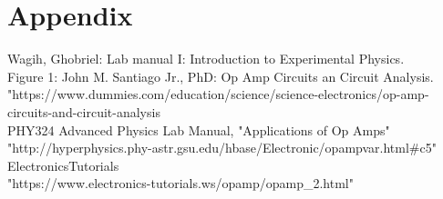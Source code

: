 \documentclass[11pt]{article}
\begin{document}
\newpage
\section*{Appendix}
Wagih, Ghobriel: Lab manual I: Introduction to Experimental Physics.\\
Figure 1: John M. Santiago Jr., PhD: Op Amp Circuits an Circuit Analysis.\\
"https://www.dummies.com/education/science/science-electronics/op-amp-circuits-and-circuit-analysis\\
PHY324 Advanced Physics Lab Manual, "Applications of Op Amps" \\
"http://hyperphysics.phy-astr.gsu.edu/hbase/Electronic/opampvar.html#c5"\\
ElectronicsTutorials\\
"https://www.electronics-tutorials.ws/opamp/opamp_2.html"\\
\end{document}
